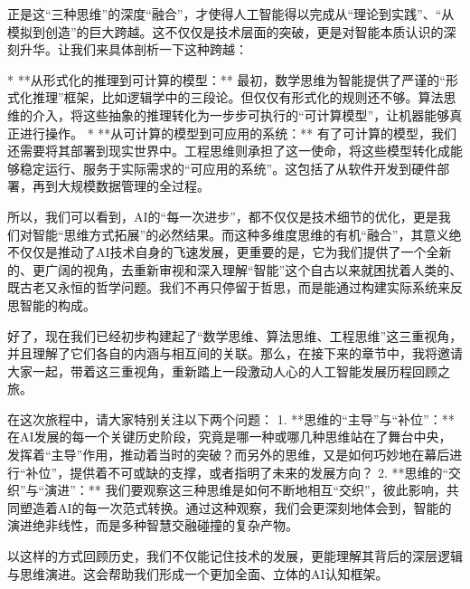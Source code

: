 正是这“三种思维”的深度“融合”，才使得人工智能得以完成从“理论到实践”、“从模拟到创造”的巨大跨越。这不仅仅是技术层面的突破，更是对智能本质认识的深刻升华。让我们来具体剖析一下这种跨越：

*   **从形式化的推理到可计算的模型：** 最初，数学思维为智能提供了严谨的“形式化推理”框架，比如逻辑学中的三段论。但仅仅有形式化的规则还不够。算法思维的介入，将这些抽象的推理转化为一步步可执行的“可计算模型”，让机器能够真正进行操作。
*   **从可计算的模型到可应用的系统：** 有了可计算的模型，我们还需要将其部署到现实世界中。工程思维则承担了这一使命，将这些模型转化成能够稳定运行、服务于实际需求的“可应用的系统”。这包括了从软件开发到硬件部署，再到大规模数据管理的全过程。

所以，我们可以看到，AI的“每一次进步”，都不仅仅是技术细节的优化，更是我们对智能“思维方式拓展”的必然结果。而这种多维度思维的有机“融合”，其意义绝不仅仅是推动了AI技术自身的飞速发展，更重要的是，它为我们提供了一个全新的、更广阔的视角，去重新审视和深入理解“智能”这个自古以来就困扰着人类的、既古老又永恒的哲学问题。我们不再只停留于哲思，而是能通过构建实际系统来反思智能的构成。



好了，现在我们已经初步构建起了“数学思维、算法思维、工程思维”这三重视角，并且理解了它们各自的内涵与相互间的关联。那么，在接下来的章节中，我将邀请大家一起，带着这三重视角，重新踏上一段激动人心的人工智能发展历程回顾之旅。

在这次旅程中，请大家特别关注以下两个问题：
1.  **思维的“主导”与“补位”：** 在AI发展的每一个关键历史阶段，究竟是哪一种或哪几种思维站在了舞台中央，发挥着“主导”作用，推动着当时的突破？而另外的思维，又是如何巧妙地在幕后进行“补位”，提供着不可或缺的支撑，或者指明了未来的发展方向？
2.  **思维的“交织”与“演进”：** 我们要观察这三种思维是如何不断地相互“交织”，彼此影响，共同塑造着AI的每一次范式转换。通过这种观察，我们会更深刻地体会到，智能的演进绝非线性，而是多种智慧交融碰撞的复杂产物。

以这样的方式回顾历史，我们不仅能记住技术的发展，更能理解其背后的深层逻辑与思维演进。这会帮助我们形成一个更加全面、立体的AI认知框架。


